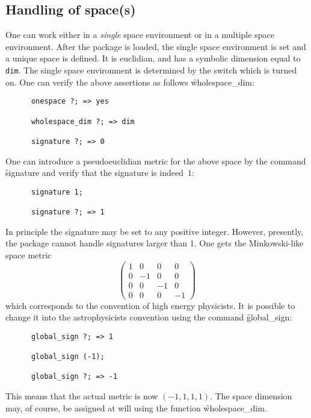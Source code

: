 \subsection{Handling of space(s)}
\hypertarget{switch:ONESPACE}{}
One can work either in a \emph{single} space environment or in
a multiple space environment. After the package is loaded,
the single space environment is set and
a unique space is defined. It is euclidian, and has a symbolic
dimension equal to \texttt{dim}.
The single space environment is determined by the switch
 which is turned on.
One can verify the above assertions as follows \f{wholespace\_dim}:
\begin{verbatim}
      onespace ?; => yes

      wholespace_dim ?; => dim

      signature ?; => 0
\end{verbatim}
One can introduce a pseudoeuclidian metric for the above space by the
command \f{signature} and
verify that the signature is indeed~$1$:
\hypertarget{command:SIGNATURE}{}
\begin{verbatim}
      signature 1;

      signature ?; => 1
\end{verbatim}
In principle the signature may be set to any positive
integer. However, presently,
the package cannot handle signatures larger than 1.
One gets the Minkowski-like space metric
\[
\left(\begin{array}{cccc}
	1 & 0 & 0 & 0  \\
	0 & -1 & 0 & 0  \\
        0 & 0 & -1 & 0 \\
        0 & 0 & 0 & -1
 \end{array}
\right)
\]
which corresponds to the convention of high energy physicists.
\hypertarget{command:GLOBAL_SIGN}{}
It is possible to change it into the  astrophysicists convention using
the command  \f{global\_sign}:
\begin{verbatim}
      global_sign ?; => 1

      global_sign (-1);

      global_sign ?; => -1
\end{verbatim}
This means that the actual metric is now  $(-1,1,1,1)$.
The space dimension may, of course, be assigned at will using the function
\f{wholespace\_dim}.
